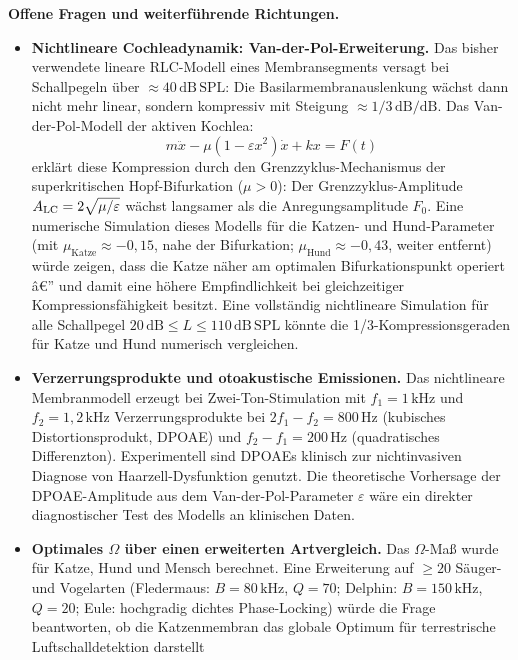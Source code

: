 ﻿\documentclass[12pt,a4paper,titlepage]{report}
\begin{document}
\textbf{Offene Fragen und weiterführende Richtungen.}
\begin{itemize}[leftmargin=2em]
  \item \textbf{Nichtlineare Cochleadynamik: Van-der-Pol-Erweiterung.}
    Das bisher verwendete lineare RLC-Modell eines Membransegments
    versagt bei Schallpegeln über $\approx 40\,\mathrm{dB\,SPL}$:
    Die Basilarmembranauslenkung wächst dann nicht mehr linear,
    sondern kompressiv mit Steigung $\approx 1/3\,\mathrm{dB/dB}$.
    Das Van-der-Pol-Modell der aktiven Kochlea:
    \[
      m\ddot{x} - \mu(1-\varepsilon x^2)\dot{x} + kx = F(t)
    \]
    erklärt diese Kompression durch den Grenzzyklus-Mechanismus
    der superkritischen Hopf-Bifurkation ($\mu > 0$):
    Der Grenzzyklus-Amplitude
    $A_{\rm LC} = 2\sqrt{\mu/\varepsilon}$
    wächst langsamer als die Anregungsamplitude $F_0$.
    Eine numerische Simulation dieses Modells für die
    Katzen- und Hund-Parameter (mit $\mu_\mathrm{Katze} \approx -0{,}15$,
    nahe der Bifurkation; $\mu_\mathrm{Hund} \approx -0{,}43$,
    weiter entfernt) würde zeigen, dass die Katze näher am
    optimalen Bifurkationspunkt operiert â€” und damit eine
    höhere Empfindlichkeit bei gleichzeitiger Kompressionsfähigkeit besitzt.
    Eine vollständig nichtlineare Simulation für alle Schallpegel
    $20\,\mathrm{dB} \leq L \leq 110\,\mathrm{dB\,SPL}$
    könnte die 1/3-Kompressionsgeraden für Katze und Hund numerisch
    vergleichen.
  \item \textbf{Verzerrungsprodukte und otoakustische Emissionen.}
    Das nichtlineare Membranmodell erzeugt bei Zwei-Ton-Stimulation
    mit $f_1=1\,\mathrm{kHz}$ und $f_2=1{,}2\,\mathrm{kHz}$
    Verzerrungsprodukte bei $2f_1-f_2 = 800\,\mathrm{Hz}$
    (kubisches Distortionsprodukt, DPOAE) und $f_2-f_1=200\,\mathrm{Hz}$
    (quadratisches Differenzton).
    Experimentell sind DPOAEs klinisch zur nichtinvasiven
    Diagnose von Haarzell-Dysfunktion genutzt.
    Die theoretische Vorhersage der DPOAE-Amplitude aus dem
    Van-der-Pol-Parameter $\varepsilon$ wäre ein direkter
    diagnostischer Test des Modells an klinischen Daten.
  \item \textbf{Optimales $\Omega$ über einen erweiterten Artvergleich.}
    Das $\Omega$-Maß wurde für Katze, Hund und Mensch berechnet.
    Eine Erweiterung auf $\geq 20$ Säuger- und Vogelarten
    (Fledermaus: $B=80\,\mathrm{kHz}$, $Q=70$;
    Delphin: $B=150\,\mathrm{kHz}$, $Q=20$;
    Eule: hochgradig dichtes Phase-Locking)
    würde die Frage beantworten, ob die Katzenmembran
    das globale Optimum für terrestrische Luftschalldetektion darstellt

\end{itemize}
\end{document}
